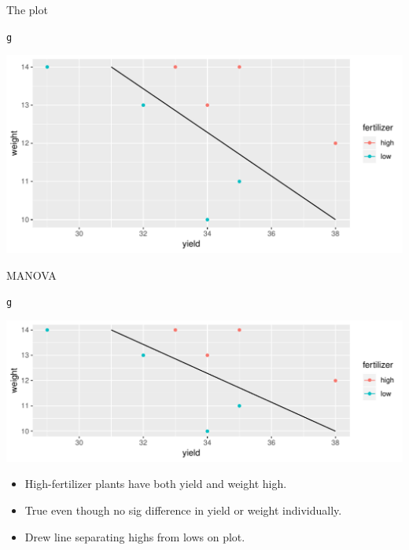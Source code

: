 \documentclass[unknownkeysallowed]{beamer}\usepackage[]{graphicx}\usepackage[]{color}
\makeatletter
\def\maxwidth{ %
  \ifdim\Gin@nat@width>\linewidth
    \linewidth
  \else
    \Gin@nat@width
  \fi
}
\newcommand{\hlstd}[1]{\textcolor[rgb]{0.345,0.345,0.345}{#1}}%
\newenvironment{kframe}{%
 \def\at@end@of@kframe{}%
 \ifinner\ifhmode%
  \def\at@end@of@kframe{\end{minipage}}%
  \begin{minipage}{\columnwidth}%
 \fi\fi%
 \def\FrameCommand##1{\hskip\@totalleftmargin \hskip-\fboxsep
 \colorbox{shadecolor}{##1}\hskip-\fboxsep
     \hskip-\linewidth \hskip-\@totalleftmargin \hskip\columnwidth}%
 \MakeFramed {\advance\hsize-\width
   \@totalleftmargin\z@ \linewidth\hsize
   \@setminipage}}%
 {\par\unskip\endMakeFramed%
 \at@end@of@kframe}
\newenvironment{knitrout}{}{} %
\makeatother
\begin{document}
\begin{frame}[fragile]{The plot}
  
 
\begin{knitrout}
\color{fgcolor}\begin{kframe}
\begin{alltt}
\hlstd{g}
\end{alltt}
\end{kframe}
\includegraphics[width=\maxwidth]{figure/charlecombe-1} 

\end{knitrout}
  
  
\end{frame}

\begin{frame}[fragile]{MANOVA}
  
\begin{knitrout}
\color{fgcolor}\begin{kframe}
\begin{alltt}
\hlstd{g}
\end{alltt}
\end{kframe}
\includegraphics[width=\maxwidth]{figure/unnamed-chunk-229-1} 

\end{knitrout}

\begin{small}
  \begin{itemize}
  \item High-fertilizer plants have both yield and weight high.
  \item True even though no sig difference in yield or weight individually.
  \item Drew line separating highs from lows on plot.
  \end{itemize}
  
\end{small}

 

\end{frame}
\end{document}
